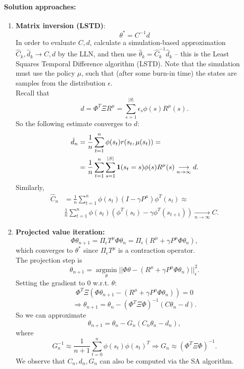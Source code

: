 \paragraph{Solution approaches:}
\begin{enumerate}\negspace
\item \textbf{Matrix inversion (LSTD)}: $$\theta^* = C^{-1}d$$
In order to evaluate $C,d$, calculate a simulation-based approximation $\hat{C}_k,\hat{d}_k \rightarrow C,d$ by the LLN, and then use $\hat{\theta}_k = \hat{C}_k^{-1} \hat{d}_k$ -- this is the Least Squares Temporal Difference algorithm (LSTD). Note that the simulation must use the policy $\mu$, such that (after some burn-in time) the states are samples from the distribution $\epsilon$.\\
Recall that
$$d = \Phi^T \Xi R^\mu = \sum_{s=1}^{|S|} \epsilon_s  {\phi}(s) R^\mu(s).$$
So the following estimate converges to $d$:
\begin{align*}
\hat{d}_n &= \frac{1}{n} \sum_{t=1}^n  {\phi}(s_t) r(s_t,\mu(s_t)) = \\
&= \frac{1}{n}\sum_{t=1}^n\sum_{s=1}^{|S|} {\bf1}(s_t=s) {\phi}(s) R^\mu(s) \underset{n\rightarrow \infty}{\longrightarrow} d .
\end{align*}
Similarly,
\begin{align*}
\hat{C}_n &= \frac{1}{n} \sum_{t=1}^n  {\phi}(s_t)(I-\gamma P^\mu) {\phi}^T(s_t) \approx \\
&\frac{1}{n} \sum_{t=1}^n {\phi}(s_t)( {\phi}^T(s_t)-\gamma {\phi}^T(s_{t+1}))  \underset{n\rightarrow \infty}{\longrightarrow} C .
\end{align*}

\item \textbf{Projected value iteration:}
$$\Phi \theta_{n+1} = \Pi_\epsilon T^\mu \Phi \theta_n = \Pi_\epsilon(R^\mu+\gamma P^\mu \Phi \theta_n),$$
which converges to $\theta^*$ since $\Pi_\epsilon T^\mu$ is a contraction operator.\\

The projection step is
$$ \theta_{n+1} = \underset{\theta}{\operatorname{argmin}}||\Phi \theta - (R^\mu+\gamma P^\mu \Phi \theta_n)||_\epsilon^2.$$
Setting the gradient to $0$ w.r.t. $\theta$:
$$\Phi^T \Xi(\Phi \theta_{n+1} - (R^\mu+\gamma P^\mu \Phi \theta_n)) = 0$$
$$\Rightarrow \theta_{n+1} = \theta_n - (\Phi^T\Xi\Phi)^{-1}(C \theta_n-d).$$
So we can approximate
$$\theta_{n+1} = \theta_n - G_n(C_n \theta_n -d_n),$$
where
$$G_n^{-1} \approx \frac{1}{n+1} \sum_{t=0}^n  {\phi}(s_t) {\phi}(s_t)^T \Rightarrow G_n \approx (\Phi^T \Xi \Phi)^{-1}.$$
We observe that $C_n,d_n,G_n$ can also be computed via the SA algorithm.


\end{enumerate}
